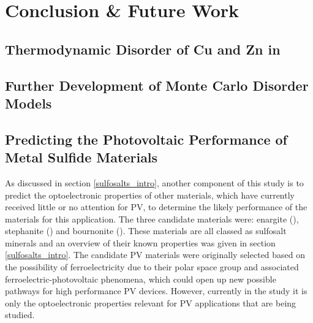 
\chapter{Conclusion \& Future Work}
\label{ch:conclusions}

\section{Thermodynamic Disorder of Cu and Zn in {\CZTS}}



\section{Further Development of Monte Carlo Disorder Models}



\section{Predicting the Photovoltaic Performance of Metal Sulfide Materials}
As discussed in section \ref{sulfosalts_intro}, another component of this study is to predict the optoelectronic properties of other materials, which have currently received little or no attention for PV, to determine the likely performance of the materials for this application. The three candidate materials were: enargite ({\enargite}), stephanite ({\stephanite}) and bournonite ({\bournonite}). These materials are all classed as sulfosalt minerals and an overview of their known properties was given in section \ref{sulfosalts_intro}. The candidate PV materials were originally selected based on the possibility of ferroelectricity due to their polar space group and associated ferroelectric-photovoltaic phenomena, which could open up new possible pathways for high performance PV devices. However, currently in the study it is only the optoelectronic properties relevant for PV applications that are being studied.\\

